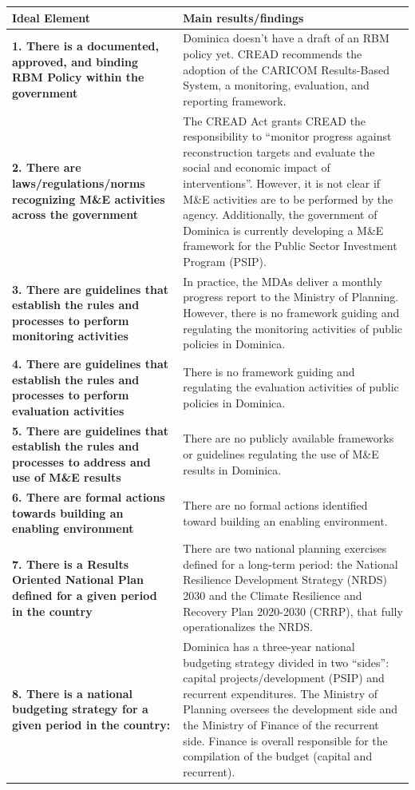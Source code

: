 \documentclass[
  10pt,
]{book}
\begin{document}
\begin{tabu} to 
\hline
Ideal Element & Main results/findings\\
\hline
\textbf{1. There is a documented, approved, and binding RBM Policy within the government} & Dominica doesn’t have a draft of an RBM policy yet. CREAD recommends the adoption of the CARICOM Results-Based System, a monitoring, evaluation, and reporting framework.\\
\hline
\textbf{2. There are laws/regulations/norms recognizing M\&E activities across the government} & The CREAD Act grants CREAD the responsibility to “monitor progress against reconstruction targets and evaluate the social and economic impact of interventions”. However, it is not clear if M\&E activities are to be performed by the agency. Additionally, the government of Dominica is currently developing a M\&E framework for the Public Sector Investment Program (PSIP).\\
\hline
\textbf{3. There are guidelines that establish the rules and processes to perform monitoring activities} & In practice, the MDAs deliver a monthly progress report to the Ministry of Planning. However, there is no framework guiding and regulating the monitoring activities of public policies in Dominica.\\
\hline
\textbf{4. There are guidelines that establish the rules and processes to perform evaluation activities} & There is no framework guiding and regulating the evaluation activities of public policies in Dominica.\\
\hline
\textbf{5. There are guidelines that establish the rules and processes to address and use of M\&E results} & There are no publicly available frameworks or guidelines regulating the use of M\&E results in Dominica.\\
\hline
\textbf{6. There are formal actions towards building an enabling environment} & There are no formal actions identified toward building an enabling environment.\\
\hline
\textbf{7. There is a Results Oriented National Plan defined for a given period in the country} & There are two national planning exercises defined for a long-term period: the National Resilience Development Strategy (NRDS) 2030 and the Climate Resilience and Recovery Plan 2020-2030 (CRRP), that fully operationalizes the NRDS.\\
\hline
\textbf{8. There is a national budgeting strategy for a given period in the country:} & Dominica has a three-year national budgeting strategy divided in two “sides”: capital projects/development (PSIP) and recurrent expenditures. The Ministry of Planning oversees the development side and the Ministry of Finance of the recurrent side. Finance is overall responsible for the compilation of the budget (capital and recurrent).\\
\hline
\end{tabu}
\endgroup{}
\end{document}
